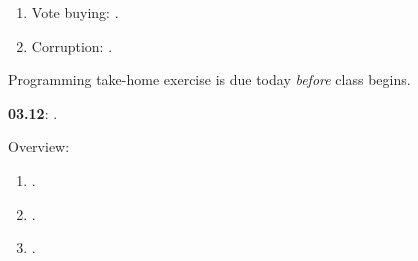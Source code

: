 \documentclass[letterpaper]{article}
\renewenvironment{itemize}{
  \begin{list}{}{
    \setlength{\leftmargin}{1.5em}
  }
}{
  \end{list}
}
\begin{document}
\begin{enumerate}
\begin{itemize}
\begin{enumerate}
            \item[$\bullet$] Vote buying: \href{https://doi.org/10.1111/ecoj.12086}{}.

            \item[$\bullet$] Corruption: \href{https://utuvolter.fi/permalink/358FIN_UTUR/1rsgc7g/cdi_crossref_primary_10_1086_6787666}{}.


            
         \end{enumerate}

       
           \item[{\color{red}$\diamond$}] {\color{red}Programming take-home exercise is due today \emph{before} class begins}.

      \end{itemize}

\item {\bf 03.12}:  {\color{ForestGreen}{\bf Ethics}}.


      \begin{itemize} 

        \item[$\diamond$] Overview:

        \begin{enumerate}

          \item[$\bullet$] \href{https://doi.org/10.1017/CBO9780511762888.011}{}.

          \item[$\bullet$] \href{https://doi.org/10.1017/CBO9780511762888.012}{}.

          \item[$\bullet$] \href{https://doi.org/10.1017/CBO9780511762888.013}{}.

          \end{enumerate}

   
      \end{itemize}

\end{enumerate}


\newpage
\printbibliography

\end{document}
